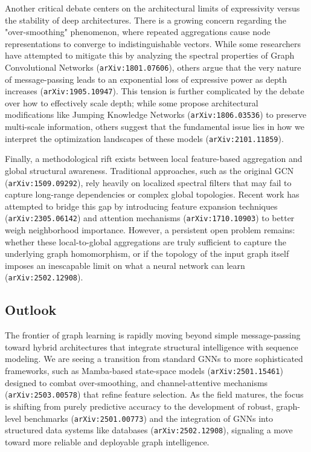\documentclass[11pt]{article}
\begin{document}
Another critical debate centers on the architectural limits of expressivity versus the stability of deep architectures. There is a growing concern regarding the "over-smoothing" phenomenon, where repeated aggregations cause node representations to converge to indistinguishable vectors. While some researchers have attempted to mitigate this by analyzing the spectral properties of Graph Convolutional Networks (\texttt{arXiv:1801.07606}), others argue that the very nature of message-passing leads to an exponential loss of expressive power as depth increases (\texttt{arXiv:1905.10947}). This tension is further complicated by the debate over how to effectively scale depth; while some propose architectural modifications like Jumping Knowledge Networks (\texttt{arXiv:1806.03536}) to preserve multi-scale information, others suggest that the fundamental issue lies in how we interpret the optimization landscapes of these models (\texttt{arXiv:2101.11859}).

Finally, a methodological rift exists between local feature-based aggregation and global structural awareness. Traditional approaches, such as the original GCN (\texttt{arXiv:1509.09292}), rely heavily on localized spectral filters that may fail to capture long-range dependencies or complex global topologies. Recent work has attempted to bridge this gap by introducing feature expansion techniques (\texttt{arXiv:2305.06142}) and attention mechanisms (\texttt{arXiv:1710.10903}) to better weigh neighborhood importance. However, a persistent open problem remains: whether these local-to-global aggregations are truly sufficient to capture the underlying graph homomorphism, or if the topology of the input graph itself imposes an inescapable limit on what a neural network can learn (\texttt{arXiv:2502.12908}).

\subsection{Outlook}

The frontier of graph learning is rapidly moving beyond simple message-passing toward hybrid architectures that integrate structural intelligence with sequence modeling. We are seeing a transition from standard GNNs to more sophisticated frameworks, such as Mamba-based state-space models (\texttt{arXiv:2501.15461}) designed to combat over-smoothing, and channel-attentive mechanisms (\texttt{arXiv:2503.00578}) that refine feature selection. As the field matures, the focus is shifting from purely predictive accuracy to the development of robust, graph-level benchmarks (\texttt{arXiv:2501.00773}) and the integration of GNNs into structured data systems like databases (\texttt{arXiv:2502.12908}), signaling a move toward more reliable and deployable graph intelligence.
\end{document}
